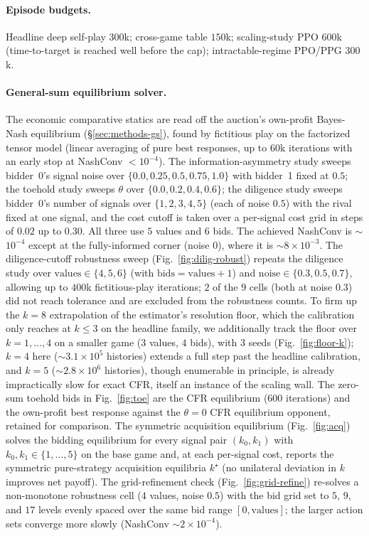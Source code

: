 \documentclass[11pt,a4paper]{article}
\begin{document}
\paragraph{Episode budgets.} Headline deep self-play $300$k; cross-game table $150$k;
scaling-study PPO $600$k (time-to-target is reached well before the cap);
intractable-regime PPO/PPG $300$k.

\paragraph{General-sum equilibrium solver.} The economic comparative statics are read
off the auction's own-profit Bayes-Nash equilibrium (\S\ref{sec:methods-gs}), found by
fictitious play on the factorized tensor model (linear averaging of pure best responses,
up to $60$k iterations with an early stop at NashConv $<10^{-4}$). The
information-asymmetry study sweeps bidder~0's signal noise over $\{0.0, 0.25, 0.5, 0.75, 1.0\}$ with
bidder~1 fixed at $0.5$; the toehold study sweeps $\theta$ over $\{0.0, 0.2, 0.4, 0.6\}$;
the diligence study sweeps bidder~0's number of signals over $\{1,2,3,4,5\}$ (each of
noise $0.5$) with the rival fixed at one signal, and the cost cutoff is taken over a
per-signal cost grid in steps of $0.02$ up to $0.30$. All three use $5$ values and $6$
bids. The achieved NashConv is $\sim$$10^{-4}$ except at the fully-informed corner
(noise $0$), where it is $\sim$$8\times10^{-3}$. The diligence-cutoff robustness sweep
(Fig.~\ref{fig:dilig-robust}) repeats the diligence study over $\text{values}\in\{4,5,6\}$
(with $\text{bids}=\text{values}+1$) and $\text{noise}\in\{0.3,0.5,0.7\}$, allowing up to
$400$k fictitious-play iterations; $2$ of the $9$ cells (both at noise $0.3$) did not
reach tolerance and are excluded from the robustness counts. To firm up the $k=8$
extrapolation of the estimator's resolution floor, which the calibration only reaches at
$k\le3$ on the headline family, we additionally track the floor over $k=1,\dots,4$ on a
smaller game ($3$ values, $4$ bids), with $3$ seeds (Fig.~\ref{fig:floor-k}); $k=4$ here
($\sim$$3.1\times10^{5}$ histories) extends a full step past the headline calibration,
and $k=5$ ($\sim$$2.8\times10^{6}$ histories), though enumerable in principle, is already
impractically slow for exact CFR, itself an instance of the scaling wall. The zero-sum toehold bids in
Fig.~\ref{fig:toe} are the CFR equilibrium ($600$ iterations) and the own-profit best
response against the $\theta{=}0$ CFR equilibrium opponent, retained for comparison.
The symmetric acquisition equilibrium (Fig.~\ref{fig:acq}) solves the bidding
equilibrium for every signal pair $(k_0, k_1)$ with $k_0, k_1\in\{1,\dots,5\}$ on the
base game and, at each per-signal cost, reports the symmetric pure-strategy acquisition
equilibria $k^\star$ (no unilateral deviation in $k$ improves net payoff). The
grid-refinement check (Fig.~\ref{fig:grid-refine}) re-solves a non-monotone robustness
cell ($4$ values, noise $0.5$) with the bid grid set to $5$, $9$, and $17$ levels evenly
spaced over the same bid range $[0,\text{values}]$; the larger action sets converge more
slowly (NashConv $\sim$$2\times10^{-4}$).
\end{document}
